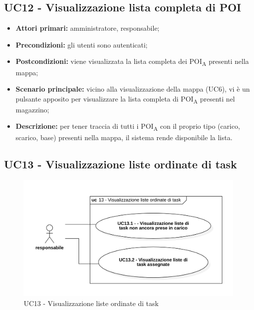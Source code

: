 \subsection{UC12 - Visualizzazione lista completa di POI}
\begin{itemize}
	\item 	\textbf{Attori primari:} amministratore, responsabile;
	\item 	\textbf{Precondizioni:} gli utenti sono autenticati;
	\item 	\textbf{Postcondizioni:} viene visualizzata la lista completa dei POI\textsubscript{A} presenti nella mappa;
	\item 	\textbf{Scenario principale:} vicino alla visualizzazione della mappa (UC6), vi è un pulsante apposito per visualizzare la lista completa di POI\textsubscript{A} presenti nel magazzino;
	\item 	\textbf{Descrizione:} per tener traccia di tutti i POI\textsubscript{A} con il proprio tipo (carico, scarico, base) presenti nella mappa, il sistema rende disponibile la lista.

\end{itemize}

\subsection{UC13 - Visualizzazione liste ordinate di task}

\begin{figure}[H]
	\centering
	\includegraphics[scale=0.52]{res/images/uc13.png}
	\caption{UC13 - Visualizzazione liste ordinate di task}
\end{figure}


